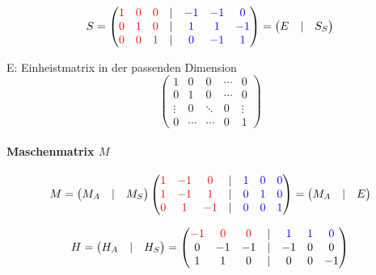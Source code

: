 \documentclass[german]{article}
\begin{document}
\[
	S =
	\begin{pmatrix}
		{\color{red} 1} & {\color{red} 0} & {\color{red} 0} & | & {\color{blue} -1} & {\color{blue} -1} & {\color{blue} 0} \\
		{\color{red} 0} & {\color{red} 1} & {\color{red} 0} & | & {\color{blue} 1} & {\color{blue} 1} & {\color{blue} -1} \\
		{\color{red} 0} & {\color{red} 0} & {\color{red} 1} & | & {\color{blue} 0} & {\color{blue} -1} & {\color{blue} 1}
	\end{pmatrix} =
	\begin{pmatrix}
		E & | & S_S
	\end{pmatrix}
\]

E: Einheistmatrix in der passenden Dimension
\[
	\begin{pmatrix}
		1 & 0 & 0 & \cdots & 0 \\
		0 & 1 & 0 & \cdots & 0 \\
		\vdots & 0 & \ddots & 0 & \vdots \\
		0 & \cdots & \cdots & 0 & 1
	\end{pmatrix}
\]

\paragraph{Maschenmatrix $M$}

\[
	M = \begin{pmatrix} M_A & | & M_S \end{pmatrix}
	\begin{pmatrix}
		{\color{red} 1} & {\color{red} -1} & {\color{red} 0} & | & {\color{blue} 1} & {\color{blue} 0} & {\color{blue} 0} \\
		{\color{red} 1} & {\color{red} -1} & {\color{red} 1} & | & {\color{blue} 0} & {\color{blue} 1} & {\color{blue} 0} \\
		{\color{red} 0} & {\color{red} 1} & {\color{red} -1} & | & {\color{blue} 0} & {\color{blue} 0} & {\color{blue} 1}
	\end{pmatrix} = \begin{pmatrix} M_A & | & E \end{pmatrix}
\]

\[
	H = \begin{pmatrix} H_A & | & H_S \end{pmatrix} =
	\begin{pmatrix}
		{\color{red} -1} & {\color{red} 0} & {\color{red} 0} & | & {\color{blue} 1} & {\color{blue} 1} & {\color{blue} 0} \\
		0 & -1 & -1 & | & -1 & 0 & 0 \\
		1 & 1 & 0 & | & 0 & 0 & -1 \\
	\end{pmatrix}
\]
\end{document}
